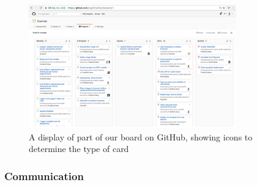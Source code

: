 \begin{figure}[H]
	\centering
	\includegraphics[width=0.8\textwidth]{images/github-project}
	\caption[CowHub's 'Kanban' board on GitHub using GitHub Projects]{
		A display of part of our board on GitHub, showing icons to determine the type of card
	}
\end{figure}


\subsubsection{Communication}







